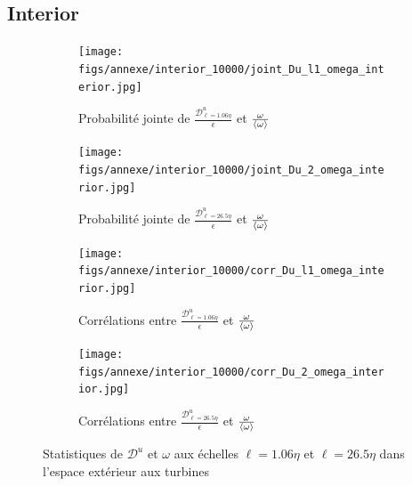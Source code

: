 \documentclass[13pt, a4paper]{extarticle}
\begin{document}
\subsection{Interior}
\begin{figure}[H]
  \centering
  \begin{subfigure}[b]{0.48\linewidth}
  \centering
  \texttt{[image: figs/annexe/interior\_10000/joint\_Du\_l1\_omega\_interior.jpg]}
  \caption{Probabilité jointe de $\frac{\mathscr{D}^u_{\ell=1.06\eta}}{\epsilon}$ et 
  $\frac{\omega}{\left\langle \omega\right\rangle}$}
  \end{subfigure}
  \begin{subfigure}[b]{0.48\linewidth}
    \centering
    \texttt{[image: figs/annexe/interior\_10000/joint\_Du\_2\_omega\_interior.jpg]}
    \caption{Probabilité jointe de $\frac{\mathscr{D}^u_{\ell=26.5\eta}}{\epsilon}$ et 
    $\frac{\omega}{\left\langle \omega\right\rangle}$}
    \end{subfigure}
    \begin{subfigure}[b]{0.48\linewidth}
      \centering
      \texttt{[image: figs/annexe/interior\_10000/corr\_Du\_l1\_omega\_interior.jpg]}
      \caption{Corrélations entre $\frac{\mathscr{D}^u_{\ell=1.06\eta}}{\epsilon}$ et 
      $\frac{\omega}{\left\langle \omega\right\rangle}$}
      \end{subfigure}
      \begin{subfigure}[b]{0.48\linewidth}
        \centering
        \texttt{[image: figs/annexe/interior\_10000/corr\_Du\_2\_omega\_interior.jpg]}
        \caption{Corrélations entre $\frac{\mathscr{D}^u_{\ell=26.5\eta}}{\epsilon}$ et 
        $\frac{\omega}{\left\langle \omega\right\rangle}$}
        \end{subfigure}
  \caption{Statistiques de $\mathscr{D}^u$ et $\omega$ aux échelles $\ell=1.06\eta$ et 
  $\ell=26.5\eta$ dans l'espace extérieur aux turbines}
\end{figure}
\end{document}
